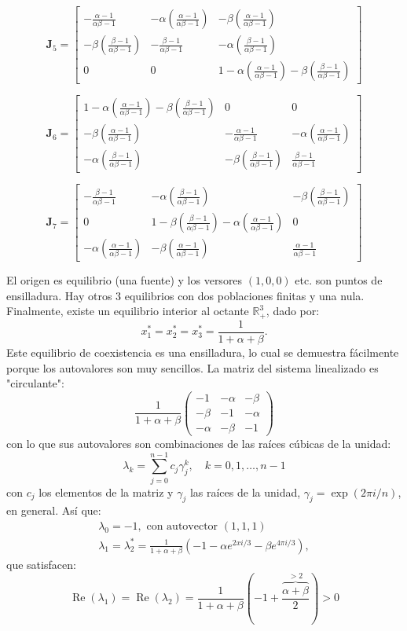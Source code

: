 \documentclass[twocolumn,aps,prl]{revtex4-1}
\newcommand{\talf}{\frac{\alpha - 1}{\alpha \beta - 1} }
\newcommand{\tbet}{\frac{\beta  - 1}{\alpha \beta - 1} }
\begin{document}
$$
\mathbf{J}_5 = 
\begin{bmatrix}
    -\talf  & - \alpha (\talf)& - \beta (\talf)\\
    - \beta (\tbet) & -\tbet & - \alpha (\tbet) \\
    0 & 0 & 1 - \alpha (\talf) - \beta (\tbet)
\end{bmatrix}
$$

$$
\mathbf{J}_6 = 
\begin{bmatrix}
    1 - \alpha (\talf) - \beta (\tbet) & 0 & 0 \\
    - \beta (\talf) & -\talf & - \alpha (\talf) \\
    - \alpha (\tbet) & - \beta (\tbet) & \tbet
\end{bmatrix}
$$

$$
\mathbf{J}_7 = 
\begin{bmatrix}
    -\tbet & - \alpha (\tbet) & - \beta (\tbet) \\
    0 & 1 - \beta (\tbet) - \alpha (\talf) & 0 \\
    - \alpha (\talf) & - \beta (\talf) & \talf
\end{bmatrix}
$$

El origen es equilibrio (una fuente) y los versores $(1,0,0)$ etc. son puntos de ensilladura. Hay otros 3 equilibrios con dos poblaciones finitas y una nula. Finalmente, existe un equilibrio interior al octante $\mathbb{R}_{+}^{3}$, dado por:
$$
x_{1}^{*}=x_{2}^{*}=x_{3}^{*}=\frac{1}{1+\alpha+\beta} .
$$
Este equilibrio de coexistencia es una ensilladura, lo cual se demuestra fácilmente porque los autovalores son muy sencillos. La matriz del sistema linealizado es "circulante":
$$
\frac{1}{1+\alpha+\beta}\left(\begin{array}{ccc}
-1 & -\alpha & -\beta \\
-\beta & -1 & -\alpha \\
-\alpha & -\beta & -1
\end{array}\right)
$$
con lo que sus autovalores son combinaciones de las raíces cúbicas de la unidad:
$$
\lambda_{k}=\sum_{j=0}^{n-1} c_{j} \gamma_{j}^{k}, \quad k=0,1, \ldots, n-1
$$
con $c_{j}$ los elementos de la matriz y $\gamma_{j}$ las raíces de la unidad, $\gamma_{j}=\exp (2 \pi i / n)$, en general. Así que:
$$
\begin{array}{c}
\lambda_{0}=-1, \text { con autovector }(1,1,1) \\
\lambda_{1}=\lambda_{2}^{*}=\frac{1}{1+\alpha+\beta}\left(-1-\alpha e^{2 x i / 3}-\beta e^{4 \pi i / 3}\right),
\end{array}
$$
que satisfacen:
$$
\operatorname{Re}\left(\lambda_{1}\right)=\operatorname{Re}\left(\lambda_{2}\right)=\frac{1}{1+\alpha+\beta}\left(-1+\frac{\overbrace{\alpha+\beta}^{>2}}{2}\right)>0
$$
\end{document}
